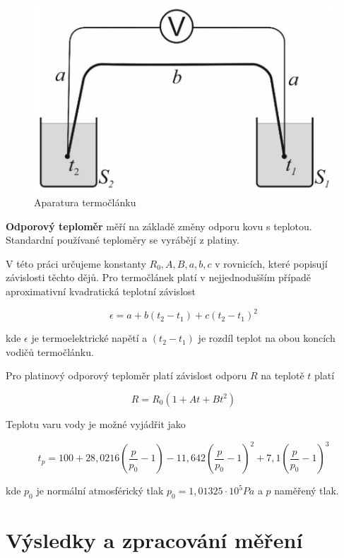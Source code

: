 \begin{figure}[h]
    \centering
    \includegraphics[width=0.5\linewidth]{8 - Kalibrace odporového teploměru a termočlánku//Prototkol - kalibrace teploměru//img/Aparatura termočlánku.png}
    \caption{Aparatura termočlánku}
    \label{fig:aparatura-termoclanku}
\end{figure}

\textbf{Odporový teploměr} měří na základě změny odporu kovu s teplotou. Standardní používané teploměry se vyrábějí z platiny.

V této práci určujeme konstanty $R_0, A, B, a, b, c$ v rovnicích, které popisují závislosti těchto dějů. Pro termočlánek platí v nejjednodušším případě aproximativní kvadratická teplotní závislost

\begin{equation}
    \epsilon = a + b(t_2 - t_1) + c(t_2 - t_1)^2
\end{equation}

kde $\epsilon$ je termoelektrické napětí a $(t_2 - t_1)$ je rozdíl teplot na obou koncích vodičů termočlánku.

Pro platinový odporový teploměr platí závislost odporu $R$ na teplotě $t$ platí

\begin{equation}
    R = R_0 (1 + At + Bt^2)
\end{equation}

Teplotu varu vody je možné vyjádřit jako

\begin{equation}
    t_p = 100 + 28,0216 \left( \frac{p}{p_0} - 1 \right) - 11,642 \left( \frac{p}{p_0} - 1 \right)^2 + 7,1 \left( \frac{p}{p_0} - 1 \right)^3
\end{equation}

kde $p_0$ je normální atmosférický tlak $p_0 = 1,01325 \cdot 10^5 Pa$ a $p$ naměřený tlak.

\section{Výsledky a zpracování měření}

